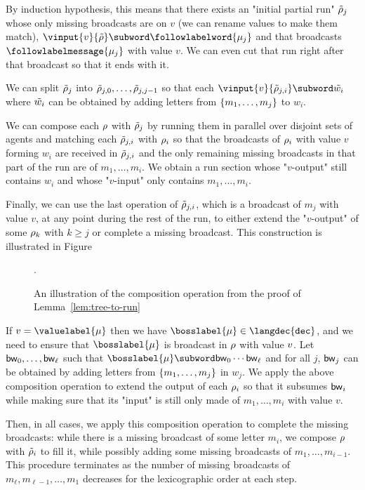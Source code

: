 By induction hypothesis, this means that there exists an "initial partial run" $\Tilde{\rho}_j$ whose only missing broadcasts are on $v$ (we can rename values to make them match), $\vinput{v}{\Tilde{\run}} \subword \followlabelword{\node_{j}}$ and that broadcasts $\followlabelmessage{\node_{j}}$ with value $v$. We can even cut that run right after that broadcast so that it ends with it. 

We can split $\Tilde{\rho}_j$ into $\Tilde{\rho}_{j, 0}, \ldots, \Tilde{\rho}_{j,j-1}$ so that each  $\vinput{v}{\Tilde{\run}_{j, i}} \subword \Tilde{w_i}$ where $\Tilde{w_i}$ can be obtained by adding letters from $\{m_1, \ldots, m_j\}$ to $w_i$.

We can compose each $\rho$ with $\Tilde{\rho}_{j}$ by running them in parallel over disjoint sets of agents and matching each $\Tilde{\rho}_{j, i}$ with $\rho_i$ so that the broadcasts of $\rho_i$ with value $v$ forming $w_i$ are received in $\Tilde{\rho}_{j, i}$ and the only remaining missing broadcasts in that part of the run are of $m_1, \ldots, m_i$.
We obtain a run section whose "$v$-output" still contains $w_i$ and whose "$v$-input" only contains $m_1, \ldots, m_i$. 

Finally, we can use the last operation of $\Tilde{\rho}_{j, i}$, which is a broadcast of $m_j$ with value $v$, at any point during the rest of the run, to either extend the "$v$-output" of some $\rho_k$ with $k \geq j$ or complete a missing broadcast.
This construction is illustrated in Figure
\begin{figure}
	
	\caption{An illustration of the composition operation from the proof of Lemma~\ref{lem:tree-to-run}}.
	\label{fig:tree-to-run}
\end{figure}
If $\val = \valuelabel{\node}$ then we have $\bosslabel{\node} \in \langdec{\decsymb}$, and we need to ensure that $\bosslabel{\node}$ is broadcast in $\rho$ with value $v$.
Let $\mathsf{bw}_0, \ldots, \mathsf{bw}_\ell$ such that $\bosslabel{\node} \subword \bossspec_0\cdots\bossspec_\ell$ and for all $j$, $\mathsf{bw}_j$ can be obtained by adding letters from $\{m_1,\ldots, m_j\}$ in $w_j$.
We apply the above composition operation to extend the output of each $\rho_{i}$ so that it subsumes $\mathsf{bw}_i$ while making sure that its "input" is still only made of $m_1, \ldots, m_i$ with value $v$. 

Then, in all cases, we apply this composition operation to complete the missing broadcasts: while there is a missing broadcast of some letter $m_i$, we compose $\rho$ with $\Tilde{\rho}_i$ to fill it, while possibly adding some missing broadcasts of $m_1, \ldots, m_{i-1}$.
This procedure terminates as the number of missing broadcasts of $m_\ell, m_{\ell-1}, \ldots, m_1$ decreases for the lexicographic order at each step.

